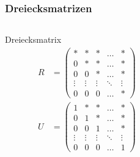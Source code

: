 %
%
%
\begin{frame}[t]
\frametitle{Dreiecksmatrizen}
\begin{columns}[t,onlytextwidth]
\begin{column}{0.31\textwidth}
\begin{block}{Dreiecksmatrix}
\begin{align*}
R&=
\begin{pmatrix}
*&*&*&\dots&*\\
0&*&*&\dots&*\\
0&0&*&\dots&*\\
\vdots&\vdots&\vdots&\ddots&\vdots\\
0&0&0&\dots&*
\end{pmatrix}
\\
U&=
\begin{pmatrix}
1&*&*&\dots&*\\
0&1&*&\dots&*\\
0&0&1&\dots&*\\
\vdots&\vdots&\vdots&\ddots&\vdots\\
0&0&0&\dots&1
\end{pmatrix}
\end{align*}
\end{block}
\end{column}
\begin{column}{0.31\textwidth}
\end{column}
\begin{column}{0.31\textwidth}
\end{column}
\end{columns}
\end{frame}
